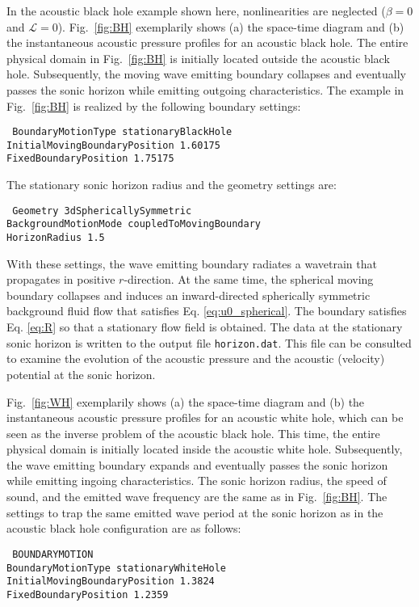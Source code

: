 In the acoustic black hole example shown here, nonlinearities are neglected ($\beta=0$ and $\mathcal{L}=0$). Fig.~\ref{fig:BH} exemplarily shows (a) the space-time diagram and (b) the instantaneous acoustic pressure profiles for an acoustic black hole. The entire physical domain in Fig.~\ref{fig:BH} is initially located outside the acoustic black hole. Subsequently, the moving wave emitting boundary collapses and eventually passes the sonic horizon while emitting outgoing characteristics. The example in Fig.~\ref{fig:BH} is realized by the following boundary settings:

{\tt
BoundaryMotionType stationaryBlackHole \\
InitialMovingBoundaryPosition 1.60175 \\
FixedBoundaryPosition 1.75175
}

The stationary sonic horizon radius and the geometry settings are:

{\tt
Geometry 3dSphericallySymmetric \\
BackgroundMotionMode coupledToMovingBoundary \\
HorizonRadius 1.5
}

With these settings, the wave emitting boundary radiates a wavetrain that propagates in positive $r$-direction. At the same time, the spherical moving boundary collapses and induces an inward-directed spherically symmetric background fluid flow that satisfies Eq. \eqref{eq:u0_spherical}. The boundary satisfies Eq. \eqref{eq:R} so that a stationary flow field is obtained. The data at the stationary sonic horizon is written to the output file {\tt horizon.dat}. This file can be consulted to examine the evolution of the acoustic pressure and the acoustic (velocity) potential at the sonic horizon.

Fig.~\ref{fig:WH} exemplarily shows (a) the space-time diagram and (b) the instantaneous acoustic pressure profiles for an acoustic white hole, which can be seen as the inverse problem of the acoustic black hole. This time, the entire physical domain is initially located inside the acoustic white hole. Subsequently, the wave emitting boundary expands and eventually passes the sonic horizon while emitting ingoing characteristics. The sonic horizon radius, the speed of sound, and the emitted wave frequency are the same as in Fig.~\ref{fig:BH}. The settings to trap the same emitted wave period at the sonic horizon as in the acoustic black hole configuration are as follows:

{\tt
BOUNDARYMOTION \\
BoundaryMotionType stationaryWhiteHole \\
InitialMovingBoundaryPosition 1.3824 \\
FixedBoundaryPosition 1.2359
}

